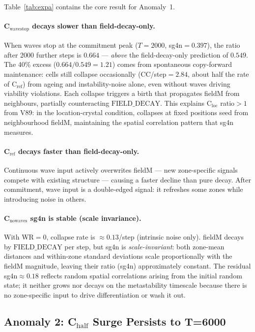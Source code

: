 \documentclass[11pt]{article}
\begin{document}
Table~\ref{tab:expa} contains the core result for Anomaly~1.

\paragraph{C$_\mathrm{wavestop}$ decays slower than field-decay-only.}
When waves stop at the commitment peak ($T=2000$, sg4n$=0.397$),
the ratio after 2000 further steps is $0.664$ --- \emph{above} the
field-decay-only prediction of $0.549$.
The 40\% excess ($0.664/0.549 = 1.21$) comes from spontaneous copy-forward
maintenance: cells still collapse occasionally (CC/step$=2.84$, about half
the rate of C$_\mathrm{ref}$) from ageing and instability-noise alone, even
without waves driving viability violations.
Each collapse triggers a birth that propagates fieldM from neighbours,
partially counteracting $\mathrm{FIELD\_DECAY}$.
This explains C$_\mathrm{loc}$ ratio$>1$ from V89: in the location-crystal
condition, collapses at fixed positions seed from neighbourhood fieldM,
maintaining the spatial correlation pattern that sg4n measures.

\paragraph{C$_\mathrm{ref}$ decays faster than field-decay-only.}
Continuous wave input actively overwrites fieldM --- new zone-specific signals
compete with existing structure --- causing a faster decline than pure decay.
After commitment, wave input is a double-edged signal: it refreshes some
zones while introducing noise in others.

\paragraph{C$_\mathrm{nowaves}$ sg4n is stable (scale invariance).}
With WR$=0$, collapse rate is $\approx 0.13$/step (intrinsic noise only).
fieldM decays by $\mathrm{FIELD\_DECAY}$ per step, but sg4n is
\emph{scale-invariant}: both zone-mean distances and within-zone standard
deviations scale proportionally with the fieldM magnitude, leaving their
ratio (sg4n) approximately constant.
The residual sg4n$\approx 0.18$ reflects random spatial correlations
arising from the initial random state; it neither grows nor decays on the
metastability timescale because there is no zone-specific input to drive
differentiation or wash it out.

\subsection{Anomaly 2: C$_\mathrm{half}$ Surge Persists to T=6000}
\end{document}
